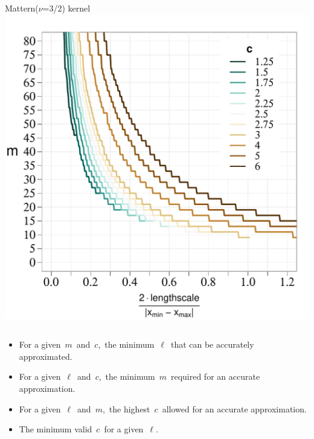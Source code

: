 \documentclass[8pt]{beamer} %
\begin{document}
\begin{frame}
\begin{columns}
\hspace{7mm} \centering \scriptsize Mattern($\nu$=3/2) kernel\\
\includegraphics[scale=0.29, trim = 0mm 0mm 5mm 10mm, clip]{ch5_fig6_lscale_vs_J_vs_c_zoomin_Matern.pdf}
\end{columns}

\begin{tcolorbox}[colframe=blue!20, colback=white, title={\small This model says...}, colbacktitle=lightblue, coltitle=black, boxrule=0.5pt]
\begin{itemize}\setlength\itemsep{1mm}
\item For a given\, $m$\, and\, $c$,\, the minimum\, $\ell$\, that can be accurately approximated.
\item For a given\, $\ell$\, and\, $c$,\, the minimum\, $m$\, required for an accurate approximation.
\item For a given\, $\ell$\, and\, $m$,\, the highest\, $c$\, allowed for an accurate approximation.
\item The minimum valid\, $c$\, for a given\, $\ell$.
\end{itemize}
\end{tcolorbox}

\end{frame}
\end{document}
